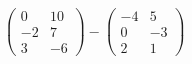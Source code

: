 $\begin{pmatrix} 0 & 10 \\ -2 & 7 \\ 3 & -6 \end{pmatrix}-\begin{pmatrix} -4 & 5 \\ 0 & -3 \\ 2 & 1 \end{pmatrix}$
